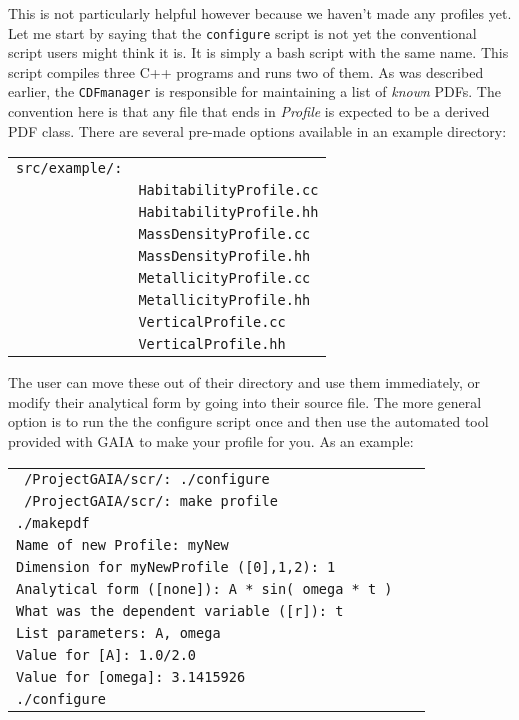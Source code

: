 \documentclass[10pt,a4paper,final]{article}
\numberwithin{equation}{section}
\newenvironment{Table}
  {\par\bigskip\noindent\minipage{\columnwidth}\centering}
    {\endminipage\par\bigskip}
\begin{document}
\begin{multicols}{2}[]
			This is not particularly helpful however because we haven't made any profiles yet.
			Let me start by saying that the \texttt{configure} script is not yet the conventional
			script users might think it is. It is simply a bash script with the same 
			name. This script compiles three \small{C++} programs and runs two of them.	As was
			described earlier, the \texttt{CDFmanager} is responsible for maintaining a list
			of \textit{known} PDFs. The convention here is that any file that ends in \textit{Profile}
			is expected to be a derived PDF class. There are several pre-made options available
			in an example directory:

			\begin{Table}
			\begin{tabular}{ll}
				\texttt{src/example/:} & \\
				& \texttt{HabitabilityProfile.cc} \\
				& \texttt{HabitabilityProfile.hh} \\
				& \texttt{MassDensityProfile.cc} \\
				& \texttt{MassDensityProfile.hh} \\
				& \texttt{MetallicityProfile.cc} \\
				& \texttt{MetallicityProfile.hh} \\
				& \texttt{VerticalProfile.cc} \\
				& \texttt{VerticalProfile.hh}
			\end{tabular}
			\end{Table}

			The user can move these out of their directory and use them immediately, or modify their
			analytical form by going into their source file. The more general option is to run the
			the configure script once and then use the automated tool provided with GAIA to make
			your profile for you. As an example:

			\begin{Table}
			\begin{tabular}{ll}
				\texttt{~/ProjectGAIA/scr/: ./configure} & \\
				\texttt{~/ProjectGAIA/scr/: make profile} & \\
				\texttt{./makepdf} & \\
				\texttt{Name of new Profile: myNew} & \\
				\texttt{Dimension for myNewProfile ([0],1,2): 1} & \\
				\texttt{Analytical form ([none]): A * sin( omega * t ) } & \\
				\texttt{What was the dependent variable ([r]): t} & \\
				\texttt{List parameters: A, omega} & \\
				\texttt{Value for [A]: 1.0/2.0} & \\
				\texttt{Value for [omega]: 3.1415926 } & \\
				\texttt{./configure} &
			\end{tabular}
			\end{Table}


\end{multicols}
\end{document}
